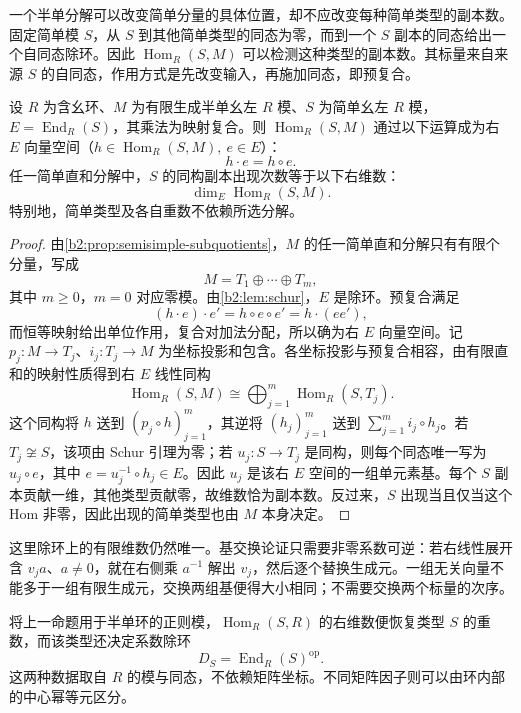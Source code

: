 一个半单分解可以改变简单分量的具体位置，却不应改变每种简单类型的副本数。固定简单模 \(S\)，从 \(S\) 到其他简单类型的同态为零，而到一个 \(S\) 副本的同态给出一个自同态除环。因此 \(\operatorname{Hom}_R(S,M)\) 可以检测这种类型的副本数。其标量来自来源 \(S\) 的自同态，作用方式是先改变输入，再施加同态，即预复合。

\begin{proposition}[半单分解中的重数]\label{b2:prop:semisimple-multiplicity}
	设 \(R\) 为含幺环、\(M\) 为有限生成半单幺左 \(R\) 模、\(S\) 为简单幺左 \(R\) 模，\(E=\operatorname{End}_R(S)\)，其乘法为映射复合。则 \(\operatorname{Hom}_R(S,M)\) 通过以下运算成为右 \(E\) 向量空间（\(h\in\operatorname{Hom}_R(S,M),\ e\in E\)）：
	\[
		h\cdot e=h\circ e.
	\]
	任一简单直和分解中，\(S\) 的同构副本出现次数等于以下右维数：
	\[
		\dim_E\operatorname{Hom}_R(S,M).
	\]
	特别地，简单类型及各自重数不依赖所选分解。
\end{proposition}
\begin{proof}
	由\cref{b2:prop:semisimple-subquotients}，\(M\) 的任一简单直和分解只有有限个分量，写成
	\[
		M=T_1\oplus\cdots\oplus T_m,
	\]
	其中 \(m\geq0\)，\(m=0\) 对应零模。由\cref{b2:lem:schur}，\(E\) 是除环。预复合满足
	\[
		(h\cdot e)\cdot e'=h\circ e\circ e'=h\cdot(ee'),
	\]
	而恒等映射给出单位作用，复合对加法分配，所以确为右 \(E\) 向量空间。记 \(p_j:M\to T_j\)、\(i_j:T_j\to M\) 为坐标投影和包含。各坐标投影与预复合相容，由有限直和的映射性质得到右 \(E\) 线性同构
	\[
		\operatorname{Hom}_R(S,M)\cong\bigoplus_{j=1}^m\operatorname{Hom}_R(S,T_j).
	\]
	这个同构将 \(h\) 送到 \((p_j\circ h)_{j=1}^m\)，其逆将 \((h_j)_{j=1}^m\) 送到 \(\sum_{j=1}^m i_j\circ h_j\)。若 \(T_j\not\cong S\)，该项由 Schur 引理为零；若 \(u_j:S\to T_j\) 是同构，则每个同态唯一写为 \(u_j\circ e\)，其中 \(e=u_j^{-1}\circ h_j\in E\)。因此 \(u_j\) 是该右 \(E\) 空间的一组单元素基。每个 \(S\) 副本贡献一维，其他类型贡献零，故维数恰为副本数。反过来，\(S\) 出现当且仅当这个 Hom 非零，因此出现的简单类型也由 \(M\) 本身决定。
\end{proof}

这里除环上的有限维数仍然唯一。基交换论证只需要非零系数可逆：若右线性展开含 \(v_j a\)、\(a\ne0\)，就在右侧乘 \(a^{-1}\) 解出 \(v_j\)，然后逐个替换生成元。一组无关向量不能多于一组有限生成元，交换两组基便得大小相同；不需要交换两个标量的次序。

\ProseParagraphBreak
将上一命题用于半单环的正则模，\(\operatorname{Hom}_R(S,R)\) 的右维数便恢复类型 \(S\) 的重数，而该类型还决定系数除环
\[
	D_S=\operatorname{End}_R(S)^{\mathrm{op}}.
\]
这两种数据取自 \(R\) 的模与同态，不依赖矩阵坐标。不同矩阵因子则可以由环内部的中心幂等元区分。

